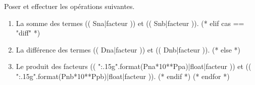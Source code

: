 \exercice
Poser et effectuer les opérations suivantes.
\begin{multicols}{2}\noindent
\begin{enumerate}
(* for cas in ordre *)
(* if cas == "somme" *)
  \item La somme des termes (( Sna|facteur )) et (( Snb|facteur )).
(* elif cas == "diff" *)
\item La différence des termes (( Dna|facteur )) et (( Dnb|facteur )).
(* else *)
\item Le produit des facteurs (( "{:.15g}".format(Pna*10**Ppa)|float|facteur )) et (( "{:.15g}".format(Pnb*10**Ppb)|float|facteur )).
(* endif *)
(* endfor *)
\end{enumerate}
\end{multicols}
